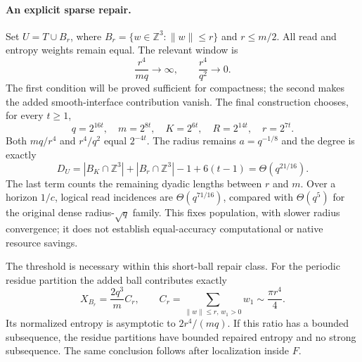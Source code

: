 \paragraph{An explicit sparse repair.}
Set $U=T\cup B_r$, where $B_r=\{w\in\mathbb Z^3:\|w\|\le r\}$ and
$r\le m/2$. All read and entropy weights remain equal. The relevant window is
\[
 \frac{r^4}{mq}\longrightarrow\infty,
 \qquad \frac{r^4}{q^2}\longrightarrow0.
\]
The first condition will be proved sufficient for compactness; the second
makes the added smooth-interface contribution vanish. The final construction
chooses, for every $t\ge1$,
\[
 q=2^{16t},\quad m=2^{8t},\quad K=2^{6t},\quad
 R=2^{14t},\quad r=2^{7t}.
\]
Both $mq/r^4$ and $r^4/q^2$ equal $2^{-4t}$. The radius remains
$a=q^{-1/8}$ and the degree is exactly
\[
 D_U=|B_K\cap\mathbb Z^3|+|B_r\cap\mathbb Z^3|-1+6(t-1)
     =\Theta(q^{21/16}).
\]
The last term counts the remaining dyadic lengths between $r$ and $m$.
Over a horizon $1/c$, logical read incidences are $\Theta(q^{71/16})$,
compared with $\Theta(q^5)$ for the original dense radius-$\sqrt q$ family.
This fixes population, with slower radius convergence; it does not establish
equal-accuracy computational or native resource savings.

The threshold is necessary within this short-ball repair class. For the
periodic residue partition the added ball contributes exactly
\[
 X_{B_r}=\frac{2q^3}{m}C_r,
 \qquad C_r=\sum_{\|w\|\le r,\,w_1>0}w_1\sim\frac{\pi r^4}{4}.
\]
Its normalized entropy is asymptotic to $2r^4/(mq)$. If this ratio has
a bounded subsequence, the residue partitions have bounded repaired
entropy and no strong subsequence. The same conclusion follows after
localization inside $F$.

